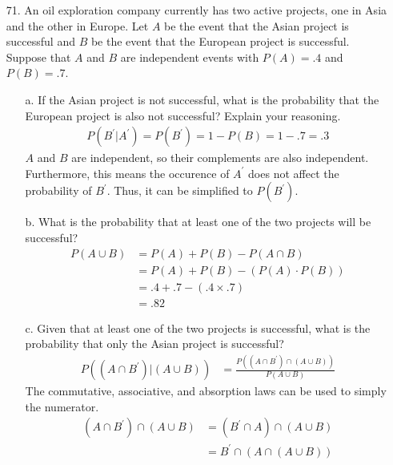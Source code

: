 \documentclass[letterpaper,12pt]{article}
\begin{document}
\maketitle

\begin{enumerate}
  \item[71.]
    An oil exploration company currently has two active projects, one in Asia and the other in Europe. Let $A$ be the event that the Asian project is successful and $B$ be the event that the European project is successful. Suppose that $A$ and $B$ are independent events with $P(A) = .4$ and $P(B) = .7$.
    \begin{enumerate}
      \item[a.]
        If the Asian project is not successful, what is the probability that the European project is also not successful? Explain your reasoning.
        \begin{align*}
          P(B^\prime|A^\prime) = P(B^\prime) = 1 - P(B) = 1 - .7 = .3
        \end{align*}
        $A$ and $B$ are independent, so their complements are also independent. Furthermore, this means the occurence of $A^\prime$ does not affect the probability of $B^\prime$. Thus, it can be simplified to $P(B^\prime)$.
      \item[b.]
        What is the probability that at least one of the two projects will be successful?
        \begin{align*}
          P(A \cup B) &= P(A) + P(B) - P(A \cap B) \\
          &= P(A) + P(B) - (P(A) \cdot P(B)) \\
          &= .4 + .7 - (.4 \times .7) \\
          &= .82
        \end{align*}
      \item[c.]
        Given that at least one of the two projects is successful, what is the probability that only the Asian project is successful?
        \begin{align*}
          P((A \cap B^\prime)|(A \cup B)) &= \frac{P((A \cap B^\prime) \cap (A \cup B))}{P(A \cup B)}
        \end{align*}
        The commutative, associative, and absorption laws can be used to simply the numerator.
        \begin{align*}
          (A \cap B^\prime) \cap (A \cup B) &= (B^\prime \cap A) \cap (A \cup B) \\
          &= B^\prime \cap (A \cap (A \cup B)) \\

\end{align*}
\end{enumerate}
\end{enumerate}
\end{document}
